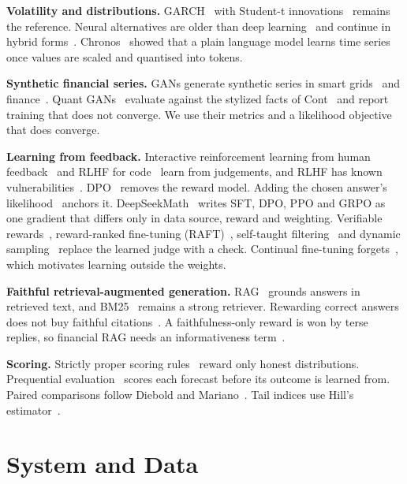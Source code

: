 \documentclass[conference]{IEEEtran}
\begin{document}
\textbf{Volatility and distributions.} GARCH~\cite{Bollerslev_1986} with Student-t
innovations~\cite{Bollerslev_1987} remains the reference. Neural alternatives are older than deep
learning~\cite{Refenes_2001} and continue in hybrid forms~\cite{Liao_2020}. Chronos~\cite{ansari2024chronos}
showed that a plain language model learns time series once values are scaled and quantised into
tokens.

\textbf{Synthetic financial series.} GANs generate synthetic series in smart
grids~\cite{Zhang_2018} and finance~\cite{Wang_2025}. Quant GANs~\cite{Wiese_2020} evaluate against
the stylized facts of Cont~\cite{Cont_2001} and report training that does not converge. We use their
metrics and a likelihood objective that does converge.

\textbf{Learning from feedback.} Interactive reinforcement learning from human
feedback~\cite{Lin_2020} and RLHF for code~\cite{Wong_2024} learn from judgements, and RLHF has known
vulnerabilities~\cite{McIntosh_2024}. DPO~\cite{rafailov2023dpo} removes the reward model. Adding the
chosen answer's likelihood~\cite{pang2024rpo} anchors it. DeepSeekMath~\cite{shao2024deepseekmath}
writes SFT, DPO, PPO and GRPO as one gradient that differs only in data source, reward and weighting.
Verifiable rewards~\cite{lambert2024tulu}, reward-ranked fine-tuning (RAFT)~\cite{dong2023raft},
self-taught filtering~\cite{zelikman2022star} and dynamic sampling~\cite{yu2025dapo} replace the
learned judge with a check. Continual fine-tuning forgets~\cite{Luo_2025}, which motivates learning
outside the weights.

\textbf{Faithful retrieval-augmented generation.} RAG~\cite{lewis2020rag} grounds answers in
retrieved text, and BM25~\cite{Robertson_2009} remains a strong retriever. Rewarding correct answers
does not buy faithful citations~\cite{postrational2026}. A faithfulness-only reward is won by terse
replies, so financial RAG needs an informativeness term~\cite{yin2026rlfkv}.

\textbf{Scoring.} Strictly proper scoring rules~\cite{Gneiting_2007} reward only honest distributions.
Prequential evaluation~\cite{Dawid_1984} scores each forecast before its outcome is learned from.
Paired comparisons follow Diebold and Mariano~\cite{Diebold_1995}. Tail indices use Hill's
estimator~\cite{Hill_1975}.

\section{System and Data}
\label{sec:system}
\end{document}

